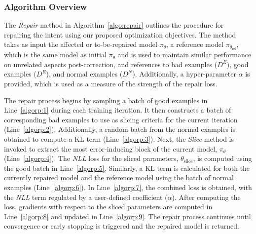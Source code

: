 \subsubsection{Algorithm Overview}


The \textit{Repair} method in Algorithm~\ref{algo:repair} outlines the procedure for repairing the intent using our proposed optimization objectives. The method takes as input the affected or to-be-repaired model \( \pi_\theta \), a reference model \( \pi_{\theta_{\text{ref}}} \), which is the same model as initial \( \pi_\theta \) and is used to maintain similar performance on unrelated aspects post-correction, and references to bad examples (\(D^E\)), good examples (\(D^R\)), and normal examples (\(D^N\)). Additionally, a hyper-parameter \( \alpha \) is provided, which is used as a measure of the strength of the repair loss.


The repair process begins by sampling a batch of good examples in Line~\ref{algorp:1} during each training iteration. It then constructs a batch of corresponding bad examples to use as slicing criteria for the current iteration (Line~\ref{algorp:2}). Additionally, a random batch from the normal examples is obtained to compute a KL term (Line~\ref{algorp:3}). Next, the \textit{Slice} method is invoked to extract the most error-inducing block of the current model, \( \pi_\theta \) (Line~\ref{algorp:4}). The \textit{NLL} loss for the sliced parameters, \( \theta_{\text{slice}} \), is computed using the good batch in Line~\ref{algorp:5}. Similarly, a KL term is calculated for both the currently repaired model and the reference model using the batch of normal examples (Line~\ref{algorp:6}). In Line~\ref{algorp:7}, the combined loss is obtained, with the \textit{NLL} term regulated by a user-defined coefficient (\(\alpha\)). After computing the loss, gradients with respect to the sliced parameters are computed in Line~\ref{algorp:8} and updated in Line~\ref{algorp:9}. The repair process continues until convergence or early stopping is triggered and the repaired model is returned.








 




 





